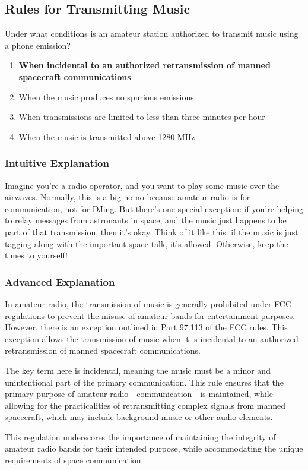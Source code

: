 \subsection{Rules for Transmitting Music}
\label{T1D04}

\begin{tcolorbox}[colback=gray!10!white,colframe=black!75!black,title=T1D04]
Under what conditions is an amateur station authorized to transmit music using a phone emission?
\begin{enumerate}[label=\Alph*)]
    \item \textbf{When incidental to an authorized retransmission of manned spacecraft communications}
    \item When the music produces no spurious emissions
    \item When transmissions are limited to less than three minutes per hour
    \item When the music is transmitted above 1280 MHz
\end{enumerate}
\end{tcolorbox}

\subsubsection{Intuitive Explanation}
Imagine you're a radio operator, and you want to play some music over the airwaves. Normally, this is a big no-no because amateur radio is for communication, not for DJing. But there's one special exception: if you're helping to relay messages from astronauts in space, and the music just happens to be part of that transmission, then it's okay. Think of it like this: if the music is just tagging along with the important space talk, it's allowed. Otherwise, keep the tunes to yourself!

\subsubsection{Advanced Explanation}
In amateur radio, the transmission of music is generally prohibited under FCC regulations to prevent the misuse of amateur bands for entertainment purposes. However, there is an exception outlined in Part 97.113 of the FCC rules. This exception allows the transmission of music when it is incidental to an authorized retransmission of manned spacecraft communications. 

The key term here is incidental, meaning the music must be a minor and unintentional part of the primary communication. This rule ensures that the primary purpose of amateur radio—communication—is maintained, while allowing for the practicalities of retransmitting complex signals from manned spacecraft, which may include background music or other audio elements.


This regulation underscores the importance of maintaining the integrity of amateur radio bands for their intended purpose, while accommodating the unique requirements of space communication.

